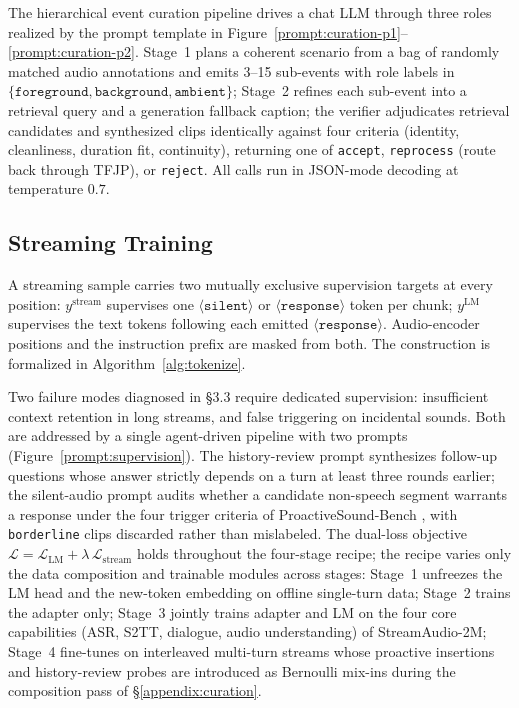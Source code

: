 \documentclass{llmxive}
\begin{document}
The hierarchical event curation pipeline drives a chat LLM through three
roles realized by the prompt template in
Figure~\ref{prompt:curation-p1}--\ref{prompt:curation-p2}. Stage~1 plans
a coherent scenario from a bag of randomly matched audio annotations and
emits 3--15 sub-events with role labels in
$\{\texttt{foreground}, \texttt{background}, \texttt{ambient}\}$;
Stage~2 refines each sub-event into a retrieval query and a generation
fallback caption; the verifier adjudicates retrieval candidates and
synthesized clips identically against four criteria (identity,
cleanliness, duration fit, continuity), returning one of \texttt{accept},
\texttt{reprocess} (route back through TFJP), or \texttt{reject}. All
calls run in JSON-mode decoding at temperature $0.7$.

\subsection{Streaming Training}
\label{appendix:streaming-training}

A streaming sample carries two mutually exclusive supervision targets at
every position: $y^{\text{stream}}$ supervises one
$\langle\texttt{silent}\rangle$ or $\langle\texttt{response}\rangle$ token
per chunk; $y^{\text{LM}}$ supervises the text tokens following each
emitted $\langle\texttt{response}\rangle$. Audio-encoder positions and
the instruction prefix are masked from both. The construction is
formalized in Algorithm~\ref{alg:tokenize}.

Two failure modes diagnosed in \S3.3 require dedicated supervision:
insufficient context retention in long streams, and false triggering on
incidental sounds. Both are addressed by a single agent-driven pipeline
with two prompts (Figure~\ref{prompt:supervision}). The history-review
prompt synthesizes follow-up questions whose answer strictly depends on
a turn at least three rounds earlier; the silent-audio prompt audits
whether a candidate non-speech segment warrants a response under the
four trigger criteria of ProactiveSound-Bench
, with \texttt{borderline}
clips discarded rather than mislabeled. The dual-loss objective
$\mathcal{L}=\mathcal{L}_{\text{LM}}+\lambda\,\mathcal{L}_{\text{stream}}$
holds throughout the four-stage recipe; the recipe varies only the data
composition and trainable modules across stages: Stage~1 unfreezes the
LM head and the new-token embedding on offline single-turn data;
Stage~2 trains the adapter only; Stage~3 jointly trains adapter and LM
on the four core capabilities (ASR, S2TT, dialogue, audio understanding)
of StreamAudio-2M; Stage~4 fine-tunes on interleaved multi-turn
streams whose proactive insertions and history-review probes are
introduced as Bernoulli mix-ins during the composition pass of
\S\ref{appendix:curation}.
\end{document}
